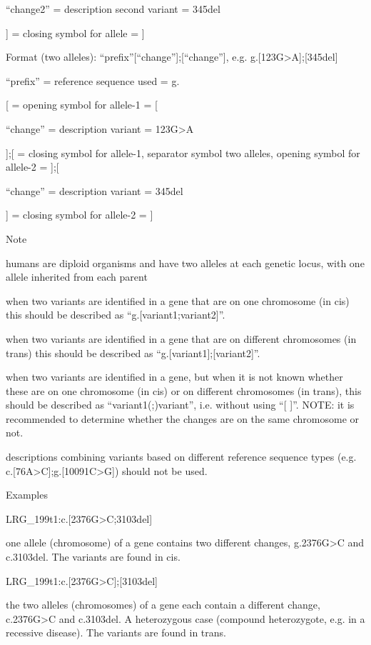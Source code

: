 \documentclass{book}
\begin{document}
	“change2” = description second variant = 345del

	] = closing symbol for allele = ]

	Format (two alleles): “prefix”[“change”];[“change”], e.g. g.[123G>A];[345del]

	“prefix” = reference sequence used = g.

	[ = opening symbol for allele-1 = [

	“change” = description variant = 123G>A

	];[ = closing symbol for allele-1, separator symbol two alleles, opening symbol for allele-2 = ];[

	“change” = description variant = 345del

	] = closing symbol for allele-2 = ]

	

	Note

	humans are diploid organisms and have two alleles at each genetic locus, with one allele inherited from each parent

	when two variants are identified in a gene that are on one chromosome (in cis) this should be described as “g.[variant1;variant2]”.

	when two variants are identified in a gene that are on different chromosomes (in trans) this should be described as “g.[variant1];[variant2]”.

	when two variants are identified in a gene, but when it is not known whether these are on one chromosome (in cis) or on different chromosomes (in trans), this should be described as “variant1(;)variant”, i.e. without using “[ ]”. NOTE: it is recommended to determine whether the changes are on the same chromosome or not.

	descriptions combining variants based on different reference sequence types (e.g. c.[76A>C];g.[10091C>G]) should not be used.

	

	

	Examples

	LRG\_199t1:c.[2376G>C;3103del]

	one allele (chromosome) of a gene contains two different changes, g.2376G>C and c.3103del. The variants are found in cis.

	LRG\_199t1:c.[2376G>C];[3103del]

	the two alleles (chromosomes) of a gene each contain a different change, c.2376G>C and c.3103del. A heterozygous case (compound heterozygote, e.g. in a recessive disease). The variants are found in trans.
\end{document}
